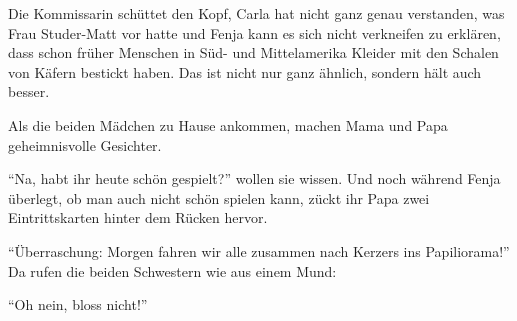 Die Kommissarin schüttet den Kopf, Carla hat nicht ganz genau verstanden, was Frau Studer-Matt vor hatte und Fenja kann es sich nicht verkneifen zu erklären, dass schon früher Menschen in Süd- und Mittelamerika Kleider mit den Schalen von Käfern bestickt haben. Das ist nicht nur ganz ähnlich, sondern hält auch besser. 

Als die beiden Mädchen zu Hause ankommen, machen Mama und Papa geheimnisvolle Gesichter. 

\enquote{Na, habt ihr heute schön gespielt?} wollen sie wissen. Und noch während Fenja überlegt, ob man auch nicht schön spielen kann, zückt ihr Papa zwei Eintrittskarten hinter dem Rücken hervor.

\enquote{Überraschung: Morgen fahren wir alle zusammen nach Kerzers ins Papiliorama!} Da rufen die beiden Schwestern wie aus einem Mund:

\enquote{Oh nein, bloss nicht!} \hfill {\color{red}\decofourleft}

